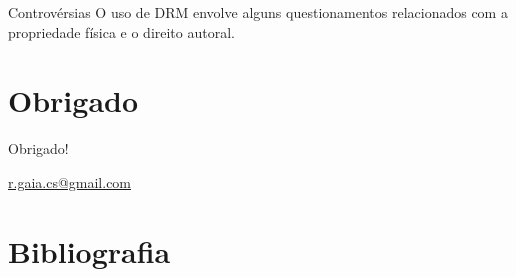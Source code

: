 \documentclass[11pt]{beamer}
\begin{document}
\begin{frame}{Controvérsias}
  O uso de DRM envolve alguns questionamentos relacionados com a propriedade
  física e o direito autoral.
\end{frame}

\section*{Obrigado}
\begin{frame}
  \begin{center}
    Obrigado!
  \end{center}
  \begin{center}
    \url{r.gaia.cs@gmail.com}
  \end{center}
\end{frame}

\section*{Bibliografia}
\begin{frame}
  
  
\end{frame}
\end{document}
